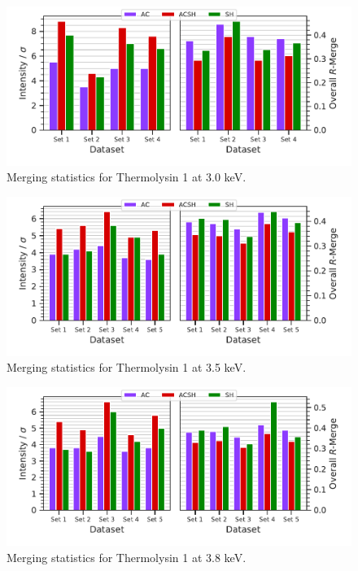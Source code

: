 \begin{figure}[h]
    \centering
    \includegraphics{plots/exp1/tlys_9_P6122/3p0_stats_grid.pdf}
    \caption{Merging statistics for Thermolysin 1 at 3.0 \unit{keV}.}
    \label{fig:tlys_9_3p0}
\end{figure}

\begin{figure}
    \centering
    \includegraphics{plots/exp1/tlys_9_P6122/3p5_stats_grid.pdf}
    \caption{Merging statistics for Thermolysin 1 at 3.5 \unit{keV}.}
    \label{fig:tlys_9_3p5}
\end{figure}

\begin{figure}[h]
    \centering
    \includegraphics{plots/exp1/tlys_9_P6122/3p8_stats_grid.pdf}
    \caption{Merging statistics for Thermolysin 1 at 3.8 \unit{keV}.}
    \label{fig:tlys_9_3p8}
\end{figure}

